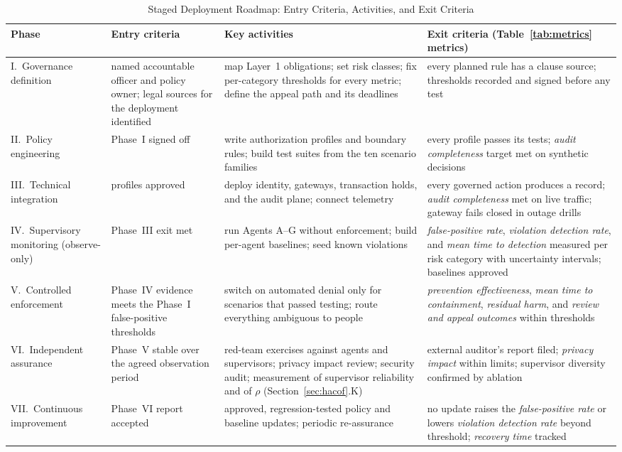 \documentclass[journal]{IEEEtran}
\begin{document}
\begin{table}[!t]
\caption{Staged Deployment Roadmap: Entry Criteria, Activities, and Exit Criteria}
\label{tab:roadmap}
\centering
\footnotesize
\setlength{\tabcolsep}{4pt}
\begin{tabular}{>{\raggedright\arraybackslash}p{2.3cm}>{\raggedright\arraybackslash}p{3.9cm}>{\raggedright\arraybackslash}p{5.0cm}>{\raggedright\arraybackslash}p{5.0cm}}
\toprule
\rowcolor{darkblue!15}
\textbf{Phase} & \textbf{Entry criteria} & \textbf{Key activities} & \textbf{Exit criteria (Table~\ref{tab:metrics} metrics)} \\
\midrule
I.\ Governance definition & named accountable officer and policy owner; legal sources for the deployment identified & map Layer~1 obligations; set risk classes; fix per-category thresholds for every metric; define the appeal path and its deadlines & every planned rule has a clause source; thresholds recorded and signed before any test \\
\rowcolor{darkblue!5}
II.\ Policy engineering & Phase~I signed off & write authorization profiles and boundary rules; build test suites from the ten scenario families & every profile passes its tests; \textit{audit completeness} target met on synthetic decisions \\
III.\ Technical integration & profiles approved & deploy identity, gateways, transaction holds, and the audit plane; connect telemetry & every governed action produces a record; \textit{audit completeness} met on live traffic; gateway fails closed in outage drills \\
\rowcolor{darkblue!5}
IV.\ Supervisory monitoring (observe-only) & Phase~III exit met & run Agents A--G without enforcement; build per-agent baselines; seed known violations & \textit{false-positive rate}, \textit{violation detection rate}, and \textit{mean time to detection} measured per risk category with uncertainty intervals; baselines approved \\
V.\ Controlled enforcement & Phase~IV evidence meets the Phase~I false-positive thresholds & switch on automated denial only for scenarios that passed testing; route everything ambiguous to people & \textit{prevention effectiveness}, \textit{mean time to containment}, \textit{residual harm}, and \textit{review and appeal outcomes} within thresholds \\
\rowcolor{darkblue!5}
VI.\ Independent assurance & Phase~V stable over the agreed observation period & red-team exercises against agents and supervisors; privacy impact review; security audit; measurement of supervisor reliability and of $\rho$ (Section~\ref{sec:hacof}.K) & external auditor's report filed; \textit{privacy impact} within limits; supervisor diversity confirmed by ablation \\
VII.\ Continuous improvement & Phase~VI report accepted & approved, regression-tested policy and baseline updates; periodic re-assurance & no update raises the \textit{false-positive rate} or lowers \textit{violation detection rate} beyond threshold; \textit{recovery time} tracked \\
\bottomrule
\end{tabular}
\end{table}
\end{document}
